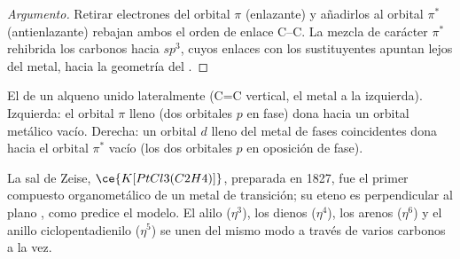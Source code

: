\begin{proof}[Argumento]
Retirar electrones del orbital $\pi$ (enlazante) y añadirlos al orbital $\pi^*$
(antienlazante) rebajan ambos el orden de enlace C--C. La mezcla de carácter $\pi^*$
rehibrida los carbonos hacia $sp^3$, cuyos enlaces con los sustituyentes apuntan lejos
del metal, hacia la geometría del .
\end{proof}

\begin{omfigure}

{\small El  de un alqueno unido lateralmente (C=C
vertical, el metal a la izquierda). Izquierda: el orbital $\pi$ lleno (dos orbitales $p$ en
fase) dona hacia un orbital metálico vacío. Derecha: un orbital $d$ lleno del metal
de fases coincidentes dona hacia el orbital $\pi^*$ vacío (los dos orbitales $p$ en oposición de
fase).}
\end{omfigure}

La sal de Zeise, $\ce{K[PtCl3(C2H4)]}$, preparada en 1827, fue el primer compuesto organometálico
de un metal de transición; su eteno es perpendicular al plano , como
predice el modelo. El alilo ($\eta^3$), los dienos ($\eta^4$), los arenos ($\eta^6$) y el anillo
ciclopentadienilo ($\eta^5$) se unen del mismo modo a través de varios carbonos a la vez.

